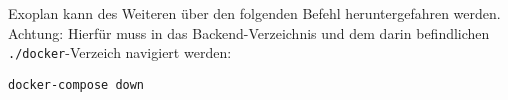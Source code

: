 Exoplan kann des Weiteren über den folgenden Befehl heruntergefahren werden. Achtung: Hierfür muss in das Backend-Verzeichnis und dem darin befindlichen \texttt{./docker}-Verzeich navigiert werden:

\texttt{docker-compose down}

